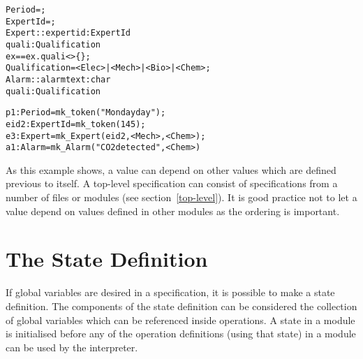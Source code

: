 \documentclass[\pformat,12pt]{article}
\begin{document}
\begin{description}
\begin{alltt}
     Period = ;
     ExpertId = ;
     Expert :: expertid : ExpertId
               quali :  Qualification
      ex == ex.quali <> \{\};
     Qualification = <Elec> | <Mech> | <Bio> | <Chem>;
     Alarm :: alarmtext :  char
              quali : Qualification

 
     \PUBLIC p1: Period = mk_token("Monday day");
     \PRIVATE eid2 : ExpertId = mk_token(145);
     \PROTECTED e3 : Expert = mk_Expert(eid2, { <Mech>, <Chem> });
     \mbox{} a1 : Alarm = mk_Alarm("CO2 detected", <Chem>)
\end{alltt}
  As this example shows, a value can depend on other values which are
  defined previous to itself.
  A top-level specification can consist of
  specifications from a number of files or modules (see
  section~\ref{top-level}).  It is good practice not to let a value depend
  on values defined in other modules as the ordering is important.
\end{description}


\section{The State Definition}\label{statedef}

If global variables are desired in a specification, it is possible to make
a state definition. The components of the state definition can be
considered the collection of global variables which can be referenced
inside operations. A state in a module is initialised before any of the
operation definitions (using that state) in a module can be used by
the interpreter.
\end{document}
